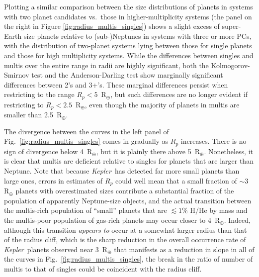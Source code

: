 \documentclass{aastex62}
\newcommand{\ik}{{\it Kepler~}}
\begin{document}
Plotting a similar comparison between the size distributions of planets in systems with two planet candidates vs.~those in higher-multiplicity systems (the panel on the right in Figure \ref{fig:radius_multis_singles}) shows a slight excess of super-Earth size planets relative to \hbox{(sub-)Neptunes} in systems with three or more PCs, with the distribution of two-planet systems lying between those for single planets and those for high multiplicity systems. While the differences between singles and multis over the entire range in radii are highly significant, both the Kolmogorov-Smirnov test and the Anderson-Darling test {show marginally significant differences between 2's and 3+'s. These marginal differences persist when restricting to the range $R_p < 5$~R$_\oplus$, but such differences are no longer evident if restricting to $R_p < 2.5$~R$_\oplus$, even though the majority of planets in multis are smaller than 2.5~R$_\oplus$.}



The divergence between the curves in the left panel of Fig.~\ref{fig:radius_multis_singles} comes in gradually as $R_p$ increases. There is no sign of divergence below  4~R$_\oplus$, but it is plainly there above 5~R$_\oplus$.  Nonetheless, it is clear that multis are deficient relative to singles for planets that are larger than Neptune. Note that because \ik has detected far more small planets than large ones, errors in estimates of $R_p$ could well mean that a small fraction of $\sim 3$ R$_\oplus$ planets with overestimated sizes contribute a substantial fraction of the population of apparently Neptune-size objects, and the actual transition between the multis-rich population of ``small'' planets that are $\lesssim 1$\% H/He by mass and the multis-poor population of gas-rich planets may occur closer to 4~R$_\oplus$. Indeed, although this transition {\it appears to} occur at a somewhat larger radius than that of the radius cliff, which is the sharp reduction in the overall occurrence rate of \ik planets observed near 3~R$_\oplus$ \citep{Kite:2019, Hsu:2019} that manifests as a reduction in slope in all of the curves in Fig.~\ref{fig:radius_multis_singles}, the break in the ratio of number of multis to that of singles could be coincident with the radius cliff.
\end{document}
